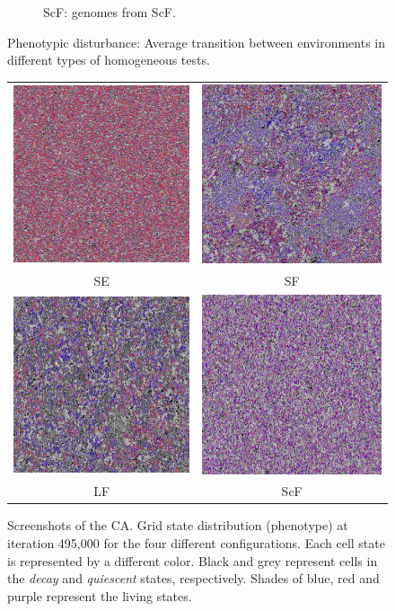 \begin{figure}[h]
\begin{subfigure}{.25\textwidth}
 \caption{ScF: genomes from ScF.}
 \label{fig:transonly}
\end{subfigure}
\caption{Phenotypic disturbance: Average transition between environments in different types of homogeneous tests.}
\label{fig:trans}
\end{figure}


\begin{figure}
	\begin{tabular}{cc}
		\includegraphics[width=.23\textwidth]{img/stable495000}&
		\includegraphics[width=.23\textwidth]{img/var495000}\\
		SE&
		SF\\
		\includegraphics[width=.23\textwidth]{img/light495000}&
		\includegraphics[width=.23\textwidth]{img/small495000}\\
		LF&
		ScF
	\end{tabular}
\caption{Screenshots of the CA. Grid state distribution (phenotype) at iteration 495,000 for the four different configurations. Each cell state is represented by a different color. Black and grey represent cells in the \emph{decay} and \emph{quiescent} states, respectively. Shades of blue, red and purple represent the living states.}
\label{fig:phenoexpl}
\end{figure}

